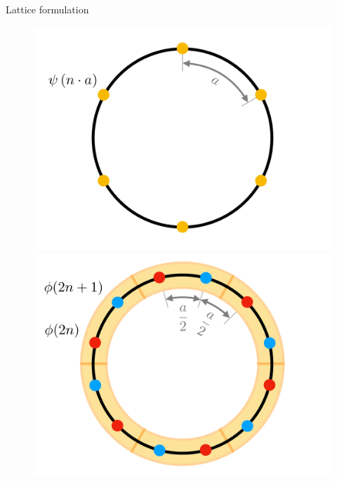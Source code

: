 \documentclass[9pt, aspectratio=169]{beamer}
\begin{document}
\begin{frame}[allowframebreaks]{Lattice formulation}
	\begin{figure}[!tbp]
		\centering
		\begin{minipage}[c]{.45\linewidth}
			\centering
			\includegraphics[width=\linewidth]{Figures/NJL1-model-solving/theoretical-fermion-lattice}
		\end{minipage}
	  \hspace{.025\linewidth}
		\begin{minipage}[c]{.45\linewidth}
			\centering
			\includegraphics[width=\linewidth]{Figures/NJL1-model-solving/computational-fermion-lattice}
		\end{minipage}
	\end{figure}


\end{frame}
\end{document}

